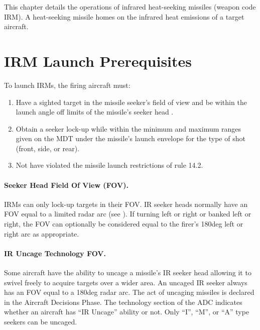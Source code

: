 \label{rule:infrared-heat-seeking-missiles}

This chapter details the operations of infrared heat-seeking missiles (weapon code IRM). A heat-seeking missile homes on the infrared heat emissions of a target aircraft.

\section{IRM Launch Prerequisites}
\label{rule:irm-launch-prerequisites}

To launch IRMs, the firing aircraft must:

\begin{enumerate}
    \item Have a sighted target in the missile seeker's field of view and be within the launch angle off limits of the missile's seeker head .
    \item Obtain a seeker lock-up while within the minimum and maximum ranges given on the MDT under the missile's launch envelope for the type of shot (front, side, or rear).
    \item Not have violated the missile launch restrictions of rule 14.2.
\end{enumerate}

\paragraph{Seeker Head Field Of View (FOV).} IRMs can only lock-up targets in their FOV. IR seeker heads normally have an FOV equal to a limited radar arc (see ). If turning left or right or banked left or right, the FOV can optionally be considered equal to the firer’s 180{deg} left or right arc as appropriate. 

\paragraph{IR Uncage Technology FOV.} \label{rule:ir-uncage} Some aircraft have the ability to uncage a missile's IR seeker head allowing it to swivel freely to acquire targets over a wider area. An uncaged IR seeker always has an FOV equal to a 180{deg} radar arc. The act of uncaging missiles is declared in the Aircraft Decisions Phase. The technology section of the ADC indicates whether an aircraft has “IR Uncage” ability or not. Only “I”, “M”, or “A” type seekers can be uncaged.


